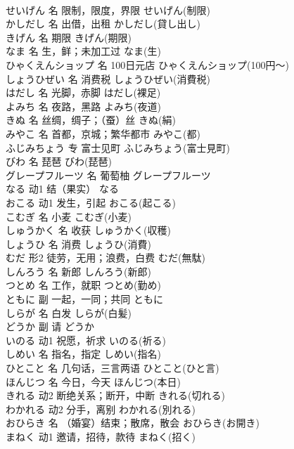 \documentclass[8pt]{extreport}
\begin{document}
\begin{CJK}{UTF8}{min}
\\	せいげん	名	限制，限度，界限	せいげん(制限)	
\\	かしだし	名	出借，出租	かしだし(貸し出し)	
\\	きげん	名	期限	きげん(期限)	
\\	なま	名	生，鲜；未加工过	なま(生)	
\\	ひゃくえんショップ	名	100日元店	ひゃくえんショップ(100円～)	
\\	しょうひぜい	名	消费税	しょうひぜい(消費税)	
\\	はだし	名	光脚，赤脚	はだし(裸足)	
\\	よみち	名	夜路，黑路	よみち(夜道)	
\\	きぬ	名	丝绸，绸子；（蚕）丝	きぬ(絹)	
\\	みやこ	名	首都，京城；繁华都市	みやこ(都)	
\\	ふじみちょう	专	富士见町	ふじみちょう(富士見町)	
\\	びわ	名	琵琶	びわ(琵琶)	
\\	グレープフルーツ	名	葡萄柚	グレープフルーツ	
\\	なる	动1	结（果实）	なる	
\\	おこる	动1	发生，引起	おこる(起こる)	
\\	こむぎ	名	小麦	こむぎ(小麦)	
\\	しゅうかく	名	收获	しゅうかく(収穫)	
\\	しょうひ	名	消费	しょうひ(消費)	
\\	むだ	形2	徒劳，无用；浪费，白费	むだ(無駄)	
\\	しんろう	名	新郎	しんろう(新郎)	
\\	つとめ	名	工作，就职	つとめ(勤め)	
\\	ともに	副	一起，一同；共同	ともに	
\\	しらが	名	白发	しらが(白髪)	
\\	どうか	副	请	どうか	
\\	いのる	动1	祝愿，祈求	いのる(祈る)	
\\	しめい	名	指名，指定	しめい(指名)	
\\	ひとこと	名	几句话，三言两语	ひとこと(ひと言)	
\\	ほんじつ	名	今日，今天	ほんじつ(本日)	
\\	きれる	动2	断绝关系；断开，中断	きれる(切れる)	
\\	わかれる	动2	分手，离别	わかれる(別れる)	
\\	おひらき	名	（婚宴）结束；散席，散会	おひらき(お開き)	
\\	まねく	动1	邀请，招待，款待	まねく(招く)	

\end{CJK}
\end{document}
